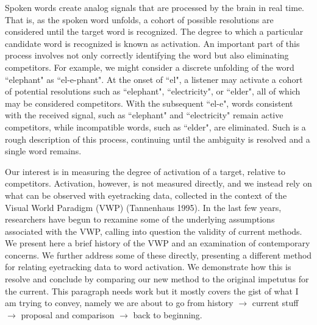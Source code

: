 \documentclass{article}
\begin{document}
Spoken words create analog signals that are processed by the brain in real time. That is, as the spoken word unfolds, a cohort of possible resolutions are considered until the target word is recognized. The degree to which a particular candidate word is recognized is known as activation. An important part of this process involves not only correctly identifying the word but also eliminating competitors. For example, we might consider a discrete unfolding of the word ``elephant" as ``el-e-phant". At the onset of ``el", a listener may activate a cohort of potential resolutions such as ``elephant", ``electricity", or ``elder", all of which may be considered competitors. With the subsequent ``el-e", words consistent with the received signal, such as ``elephant" and ``electricity" remain active competitors, while incompatible words, such as ``elder", are eliminated. Such is a rough description of this process, continuing until the ambiguity is resolved and a single word remains.



Our interest is in measuring the degree of activation of a target, relative to competitors. Activation, however, is not measured directly, and we instead rely on what can be observed with eyetracking data, collected in the context of the Visual World Paradigm (VWP) (Tannenhaus 1995)\cite{tanenhaus1995integration}. In the last few years, researchers have begun to rexamine some of the underlying assumptions associated with the VWP, calling into question the validity of current methods. We present here a brief history of the VWP and an examination of contemporary concerns. We further address some of these directly, presenting a different method for relating eyetracking data to word activation. We demonstrate how this is resolve and conclude by comparing our new method to the original impetutus for the current. This paragraph needs work but it mostly covers the gist of what I am trying to convey, namely we are about to go from history $\rightarrow$ current stuff $\rightarrow$ proposal and comparison $\rightarrow$ back to beginning.

\end{document}
